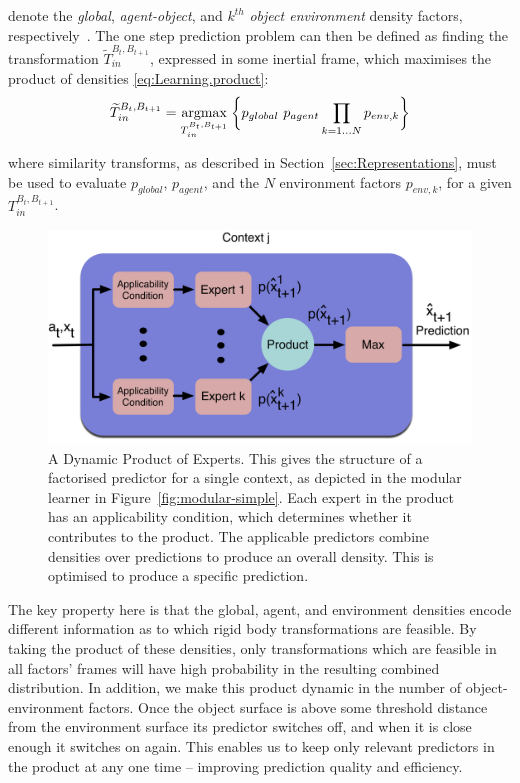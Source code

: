 \noindent denote the \textit{global}, \textit{agent-object}, and
$k^{th}$ \textit{object environment} density factors,
respectively~\citep{kopicki_prediction_2009, kopicki_prediction_2010}. 
The one step prediction problem can then be defined as finding the
transformation $\widetilde{T}_{in}^{B_{t}, B_{t+1}}$, expressed in some inertial frame, which maximises the product of densities \eqref{eq:Learning.product}:
\begin{equation}
\widetilde{T}_{in}^{B_{t}, B_{t+1}} = \underset{T_{in}^{B_{t}, B_{t+1}}}{\operatorname{argmax}}\medspace \bigg\lbrace
p_{global}\  p_{agent} \mathop{\prod}_{k=1 \ldots N}{ p_{env,k} }
\bigg\rbrace
\label{eq:Learning.MultiFactorProduct}
\end{equation}

\noindent where similarity transforms, as described in Section~\ref{sec:Representations}, must be used to evaluate $p_{global}$, $p_{agent}$, and the $N$ environment factors $p_{env,k}$, for a given ${T}_{in}^{B_{t}, B_{t+1}}$.
\begin{figure}[t]
\centerline{\includegraphics[width=\columnwidth]{product-predictor}}
\caption[Factored Prediction]{ A Dynamic Product of Experts. This gives the structure of a factorised predictor for a single context, as depicted in the modular learner in Figure~\ref{fig:modular-simple}. Each expert in the product has an applicability condition, which determines whether it contributes to the product. The applicable predictors combine densities over predictions to produce an overall density. This is optimised to produce a specific prediction.}
\label{fig:modular}
\end{figure}

The key property here is that the global, agent, and environment densities encode different information as to which rigid body transformations are feasible. By taking the product of these densities, only transformations which are feasible in all factors' frames will have high probability in the resulting combined distribution. In addition, we make this product dynamic in the number of object-environment factors. Once the object surface is above some threshold distance from the environment surface its predictor switches off, and when it is close enough it switches on again. This enables us to keep only relevant predictors in the product at any one time -- improving prediction quality and efficiency. 

